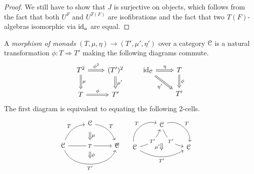 \documentclass[a4paper,11pt,oneside,openany]{scrbook}
\begin{document}
\begin{proof}
	We still have to show that $J$ is surjective on objects, which follows from
    the fact that both $U^F$ and $U^{T(F)}$ are isofibrations and the fact that
    two $T(F)$-algebras isomorphic via $\operatorname{id}_a$ are equal.
\end{proof}

\begin{defn}
	A \emph{morphism of monads} $(T,\mu,\eta)\rightarrow (T',\mu',\eta')$ over a
    category $\operatorname{\mathcal{C}}$ is a natural transformation $\phi\colon T\Rightarrow T'$
    making the following diagrams commute.
	\[
		\begin{tikzcd}
			T^2\ar[d, Rightarrow, "\mu"]\ar[r, Rightarrow, "\phi^2"]
			& (T')^2\ar[d, Rightarrow, "\mu'"] \\
			T\ar[r, Rightarrow, "\phi"]
			& T'
		\end{tikzcd}
		\quad\quad
		\begin{tikzcd}
			\id_{\C}\ar[r, Rightarrow, "\eta"]\ar[dr, Rightarrow, swap, "\eta'"]
			& T\ar[d, Rightarrow, "\phi"] \\
			& T'
		\end{tikzcd}
	\]
	The first diagram is equivalent to equating the following 2-cells.
	\[
		\begin{minipage}{0.3\linewidth}
			\begin{tikzcd}
				& \C\ar[dr, bend left, "T"]\ar[d, Rightarrow, shorten <= .6em, shorten >= .6em, "\mu"] \\
				\C\ar[rr, "T" description, ""{name=T1, anchor=center}]\ar[ur, bend left, "T"]\ar[rr, bend right=70, swap, "T'", ""{name=T2, anchor=center}]
				& \phantom{.}
				& \C
				\ar[Rightarrow, shorten <= .6em, shorten >= .6em, "\phi", from=T1, to=T2]
			\end{tikzcd}
		\end{minipage}
		\hspace{-0.9cm}
		=
		\hspace{.4cm}
		\begin{minipage}{0.3\linewidth}
			\begin{tikzcd}
				& \C\ar[dr, bend left=60, "T", ""{name=T12, anchor=center}]\ar[dr, bend right, "T'" description, ""{name=T22, anchor=center}]\ar[dd, Rightarrow, shorten <= 2em, shorten >= 2em, swap, "\mu'"] \\
				\C\ar[ur, bend left=60, "T", ""{name=T11, anchor=center}]\ar[ur, bend right, "T'" description, ""{name=T21, anchor=center}]\ar[rr, bend right, swap, "T'"]
				&& \C \\
				& \phantom{.}

\end{tikzcd}
\end{minipage}\]
\end{defn}
\end{document}
